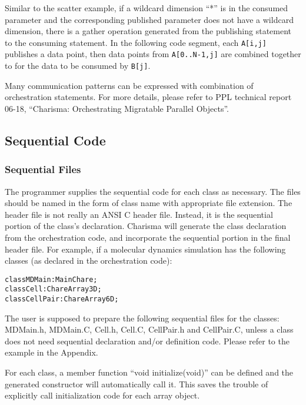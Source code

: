 \documentclass[10pt]{article}
\def\code#1{{\small {\tt {#1}}}}
\begin{document}
Similar to the scatter example, if a wildcard dimension ``*'' is in the
consumed parameter and the corresponding published parameter does not have a
wildcard dimension, there is a gather operation generated from the publishing
statement to the consuming statement. In the following code segment, each 
\code{A[i,j]} publishes a data point, then data points from \code{A[0..N-1,j]} are
combined together to for the data to be consumed by \code{B[j]}.  

Many communication patterns can be expressed with combination of orchestration
statements. For more details, please refer to PPL technical report 06-18,
``Charisma: Orchestrating Migratable Parallel Objects''.

\subsection{Sequential Code}
\label{sec:sequential}

\subsubsection{Sequential Files}
The programmer supplies the sequential code for each class as necessary. The
files should be named in the form of class name with appropriate file extension.
The header file is not really an ANSI C header file. Instead, it is the
sequential portion of the class's declaration. Charisma will generate the class 
declaration from the orchestration code, and incorporate the sequential portion
in the final header file. For example, if a molecular dynamics simulation has
the following classes (as declared in the orchestration code):

\begin{alltt}
    class MDMain : MainChare;
    class Cell : ChareArray3D;
    class CellPair : ChareArray6D;
\end{alltt}

The user is supposed to prepare the following sequential files for the classes:
MDMain.h, MDMain.C, Cell.h, Cell.C, CellPair.h and CellPair.C, unless a class
does not need sequential declaration and/or definition code. Please refer to the
example in the Appendix. 

For each class, a member function ``void initialize(void)'' can be defined and
the generated constructor will automatically call it. This saves the trouble of 
explicitly call initialization code for each array object. 
\end{document}
